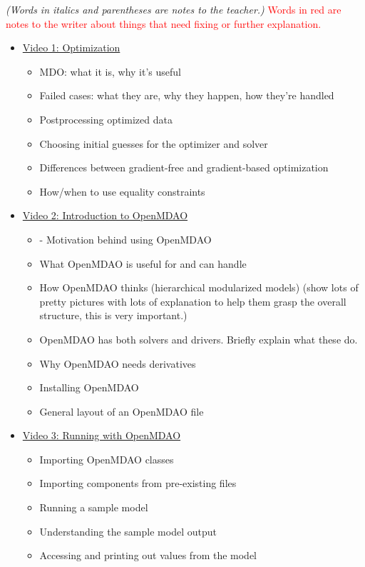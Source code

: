 \documentclass[12pt, letterpaper]{article}
\begin{document}
\textit{(Words in italics and parentheses are notes to the teacher.)} 
\newline
\textcolor{red}{Words in red are notes to the writer about things that need fixing or further explanation.}

\begin{itemize}
	\item \underline{Video 1: Optimization}
		\begin{itemize}
			\item MDO: what it is, why it's useful
			\item Failed cases: what they are, why they happen, how they're handled
			\item Postprocessing optimized data
			\item Choosing initial guesses for the optimizer and solver
			\item Differences between gradient-free and gradient-based optimization
			\item How/when to use equality constraints
		\end{itemize}
	\item \underline{Video 2: Introduction to OpenMDAO}
		\begin{itemize}
			\item -	Motivation behind using OpenMDAO
			\item What OpenMDAO is useful for and can handle
			\item How OpenMDAO thinks (hierarchical modularized models) (show lots of pretty pictures with lots of explanation to help them grasp the 			overall structure, this is very important.)
			\item OpenMDAO has both solvers and drivers. Briefly explain what these do.
			\item Why OpenMDAO needs derivatives
			\item Installing OpenMDAO
			\item General layout of an OpenMDAO file
		\end{itemize}
	\item \underline{Video 3: Running with OpenMDAO}
		\begin{itemize}
			\item Importing OpenMDAO classes
			\item Importing components from pre-existing files
			\item Running a sample model
			\item Understanding the sample model output
			\item Accessing and printing out values from the model

\end{itemize}
\end{itemize}
\end{document}
